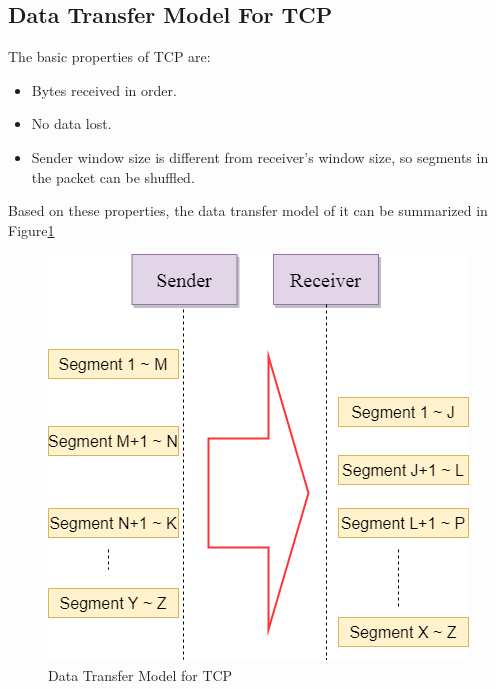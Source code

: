 \subsection{Data Transfer Model For TCP}
The basic properties of TCP are:
\begin{itemize}
  \item Bytes received in order.
  \item No data lost.
  \item Sender window size is different from receiver’s window size, so segments in the packet can be shuffled.
\end{itemize}
Based on these properties, the data transfer model of it can be summarized in Figure\ref{tcp}
\begin{figure}[h]
\centerline{\includegraphics[scale=0.6]{Figures/tcp}}
 \caption{Data Transfer Model for TCP}
\label{tcp}
\end{figure}
